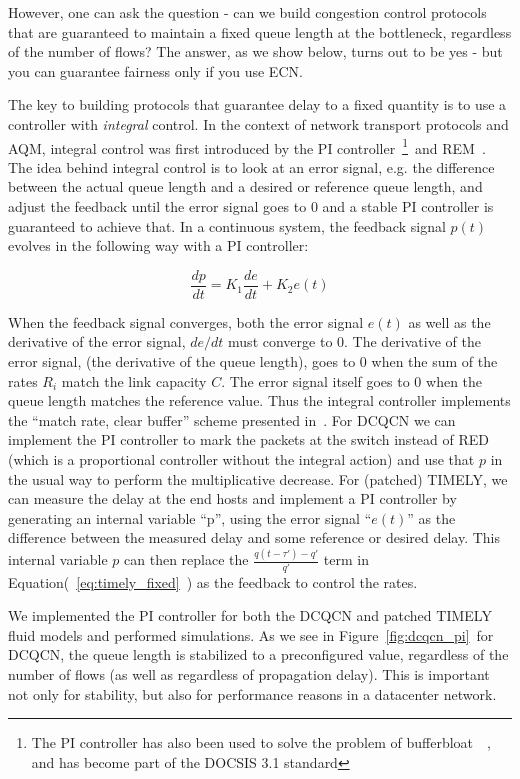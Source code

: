However, one can ask the question - can we build congestion control protocols
that are guaranteed to maintain a fixed queue length at the bottleneck,
regardless of the number of flows? The answer, as we show below, turns out to be
yes - but you can guarantee fairness only if you use ECN.

The key to building protocols that guarantee delay to a fixed quantity
is to use a controller with \emph{integral} control. In the context of
network transport protocols and AQM, integral control was first introduced
by the PI controller~\cite{hollot2001designing}\footnote{ 
The PI controller has also been used to solve the problem of bufferbloat~\cite{conf/hpsr/PanNPPSBV13,bufferbloat-pi}~, and
has become part of the DOCSIS 3.1 standard}~and
REM~\cite{REM}.
The idea behind integral control is to look at an
error signal, e.g. the difference between the actual queue length and
a desired or reference queue length, and adjust the feedback until the
error signal goes to 0 and a stable PI controller is guaranteed to
achieve that. In a continuous system, the feedback signal $p(t)$
evolves in the following way with a PI controller:

$$ \frac{dp}{dt} = K_1\frac{de}{dt}+K_2e(t) $$

When the feedback signal converges, both the error signal $e(t)$ as
well as the derivative of the error signal, $de/dt$ must converge to
0. The derivative of the error signal, (the derivative of the queue length), goes to 0
when the sum of the rates $R_i$ match the link capacity $C$. The error signal itself goes to 0
when the queue length matches the reference value. Thus the integral
controller implements the ``match rate, clear buffer'' scheme
presented in~\cite{REM}. For DCQCN we can implement the PI
controller to mark the packets at the switch instead of RED (which is
a proportional controller without the integral action) and use that
$p$ in the usual way to perform the multiplicative decrease. For
(patched) TIMELY, we can
measure the delay at the end hosts and implement a PI controller by
generating an internal variable ``p'', using the error signal
``$e(t)$'' as the difference between the measured delay and some
reference or desired delay. This internal variable $p$ can then
replace the $\frac{{q(t - \tau ') - q'}}{{q'}}$ term in
Equation(~\ref{eq:timely_fixed}~) as the feedback to control the rates.

We implemented the PI controller for both the DCQCN and patched TIMELY
fluid models and performed simulations. As we see in
Figure~\ref{fig:dcqcn_pi}~for DCQCN, the queue length is stabilized to a
preconfigured value, regardless of the number of flows (as well as
regardless of propagation delay). This is important not only for
stability, but also for performance reasons in a datacenter network.

